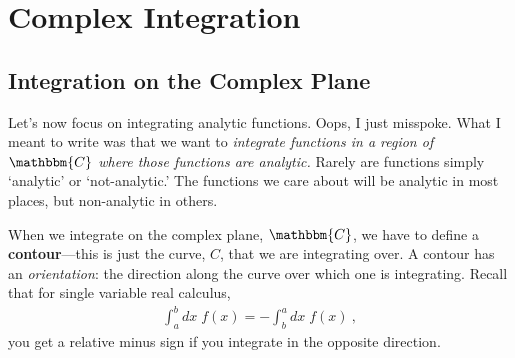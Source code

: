 \chapter{Complex Integration}

\section{Integration on the Complex Plane}

Let's now focus on integrating analytic functions. Oops, I just misspoke. What I meant to write was that we want to \emph{integrate functions in a region of $\mathbbm{C}$ where those functions are analytic.} Rarely are functions simply `analytic' or `not-analytic.' The functions we care about will be analytic in most places, but non-analytic in others. 

When we integrate on the complex plane, $\mathbbm{C}$, we have to define a \textbf{contour}---this is just the curve, $C$, that we are integrating over. A contour has an \emph{orientation}: the direction along the curve over which one is integrating. Recall that for single variable real calculus,
\begin{align}
  \int_a^b dx\; f(x) = - \int_b^a dx\; f(x) \ ,
\end{align}
you get a relative minus sign if you integrate in the opposite direction.

